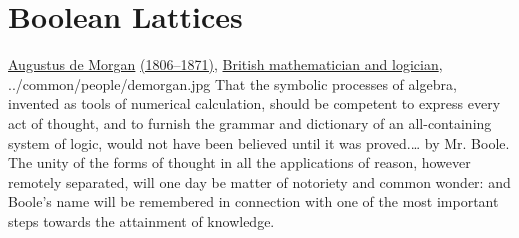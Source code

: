 

\chapter{Boolean Lattices}
\label{chp:boolean}
\qboxnpq
  {\href{http://en.wikipedia.org/wiki/Augustus_De_Morgan}{Augustus de Morgan}
   \href{http://www-history.mcs.st-andrews.ac.uk/Timelines/TimelineE.html}{(1806--1871)},
   \href{http://www-history.mcs.st-andrews.ac.uk/BirthplaceMaps/Places/UK.html}{British mathematician and logician},
   \footnotemark
  }
  {../common/people/demorgan.jpg}
  {That the symbolic processes of algebra,
   invented as tools of numerical calculation,
   should be competent to express every act of thought,
   and to furnish the grammar and dictionary of an all-containing system of logic,
   would not have been believed until it was proved.\ldots
   by Mr. Boole.
   The unity of the forms of thought in all the applications of reason,
   however remotely separated,
   will one day be matter of notoriety and common wonder:
   and Boole's name will be remembered in connection with one of the most important steps
   towards the attainment of knowledge.}

